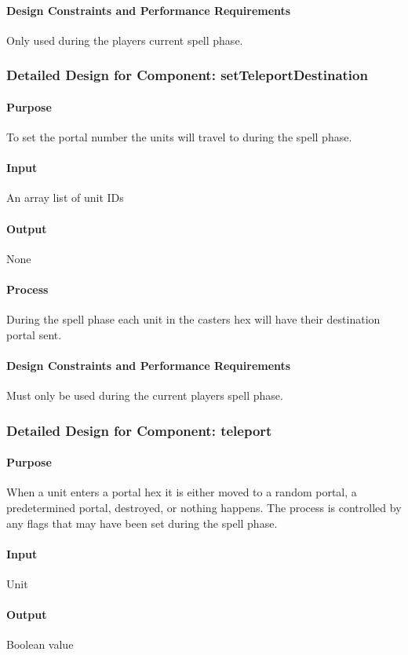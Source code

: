 \documentclass[12pt,a4paper,titlepage]{article}
\begin{document}
\paragraph{Design Constraints and Performance Requirements} Only used during the players current spell phase.

\subsubsection{Detailed Design for Component: setTeleportDestination}
\paragraph{Purpose} To set the portal number the units will travel to during the spell phase.
\paragraph{Input} An array list of unit IDs
\paragraph{Output} None
\paragraph{Process} During the spell phase each unit in the casters hex will have their destination portal sent.
\paragraph{Design Constraints and Performance Requirements} Must only be used during the current players spell phase.

\subsubsection{Detailed Design for Component: teleport}
\paragraph{Purpose} When a unit enters a portal hex it is either moved to a random portal, a predetermined portal, destroyed, or nothing happens. The process is controlled by any flags that may have been set during the spell phase.
\paragraph{Input} Unit
\paragraph{Output} Boolean value
\end{document}
